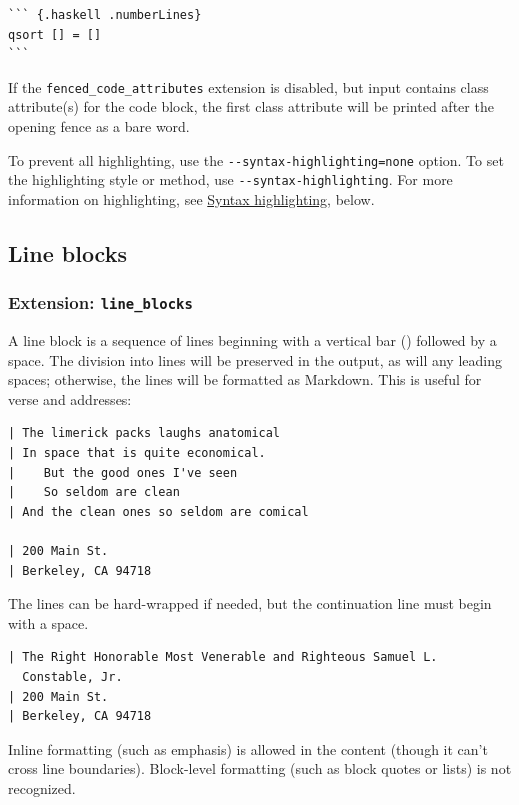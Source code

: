 \documentclass[
]{article}
\begin{document}
\begin{verbatim}
``` {.haskell .numberLines}
qsort [] = []
```
\end{verbatim}

If the \texttt{fenced\_code\_attributes} extension is disabled, but
input contains class attribute(s) for the code block, the first class
attribute will be printed after the opening fence as a bare word.

To prevent all highlighting, use the
\texttt{-\/-syntax-highlighting=none} option. To set the highlighting
style or method, use \texttt{-\/-syntax-highlighting}. For more
information on highlighting, see
\protect\hyperlink{syntax-highlighting}{Syntax highlighting}, below.

\hypertarget{line-blocks}{%
\subsection{Line blocks}\label{line-blocks}}

\hypertarget{extension-line_blocks}{%
\subsubsection{\texorpdfstring{Extension:
\texttt{line\_blocks}}{Extension: line\_blocks}}\label{extension-line_blocks}}

A line block is a sequence of lines beginning with a vertical bar
(\texttt{\textbar{}}) followed by a space. The division into lines will
be preserved in the output, as will any leading spaces; otherwise, the
lines will be formatted as Markdown. This is useful for verse and
addresses:

\begin{verbatim}
| The limerick packs laughs anatomical
| In space that is quite economical.
|    But the good ones I've seen
|    So seldom are clean
| And the clean ones so seldom are comical

| 200 Main St.
| Berkeley, CA 94718
\end{verbatim}

The lines can be hard-wrapped if needed, but the continuation line must
begin with a space.

\begin{verbatim}
| The Right Honorable Most Venerable and Righteous Samuel L.
  Constable, Jr.
| 200 Main St.
| Berkeley, CA 94718
\end{verbatim}

Inline formatting (such as emphasis) is allowed in the content (though
it can't cross line boundaries). Block-level formatting (such as block
quotes or lists) is not recognized.
\end{document}
